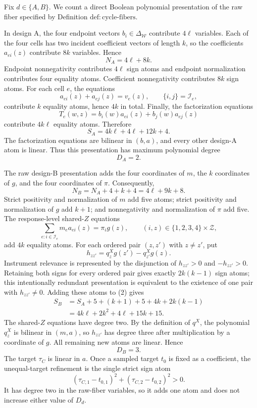 Fix \(d\in\{A,B\}\).  We count a direct Boolean polynomial presentation of the raw fiber specified by Definition \(\mathrm{def{:}cycle\text{-}fibers}\).

In design A, the four endpoint vectors \(b_i\in\Delta_{\mathcal W}\) contribute \(4\ell\) variables.  Each of the four cells has two incident coefficient vectors of length \(k\), so the coefficients \(a_{ei}(z)\) contribute \(8k\) variables.  Hence
\[
N_A=4\ell+8k.                                                   \tag{1}
\]
Endpoint nonnegativity contributes \(4\ell\) sign atoms and endpoint normalization contributes four equality atoms.  Coefficient nonnegativity contributes \(8k\) sign atoms.  For each cell \(e\), the equations
\[
a_{ei}(z)+a_{ej}(z)=v_e(z),\qquad \{i,j\}=\mathcal I_e,
\]
contribute \(k\) equality atoms, hence \(4k\) in total.  Finally, the factorization equations
\[
T_e(w,z)=b_i(w)a_{ei}(z)+b_j(w)a_{ej}(z)
\]
contribute \(4k\ell\) equality atoms.  Therefore
\[
S_A=4k\ell+4\ell+12k+4.                                       \tag{2}
\]
The factorization equations are bilinear in \((b,a)\), and every other design-A atom is linear.  Thus this presentation has maximum polynomial degree
\[
D_A=2.                                                         \tag{3}
\]

The raw design-B presentation adds the four coordinates of \(m\), the \(k\) coordinates of \(g\), and the four coordinates of \(\pi\).  Consequently,
\[
N_B=N_A+4+k+4=4\ell+9k+8.                                    \tag{4}
\]
Strict positivity and normalization of \(m\) add five atoms; strict positivity and normalization of \(g\) add \(k+1\); and nonnegativity and normalization of \(\pi\) add five.  The response-level shared-\(Z\) equations
\[
\sum_{e:i\in\mathcal I_e}m_ea_{ei}(z)=\pi_i g(z),
\qquad (i,z)\in\{1,2,3,4\}\times\mathcal Z,
\]
add \(4k\) equality atoms.  For each ordered pair \((z,z')\) with \(z\ne z'\), put
\[
h_{zz'}=q^X_zg(z')-q^X_{z'}g(z).
\]
Instrument relevance is represented by the disjunction of \(h_{zz'}>0\) and \(-h_{zz'}>0\).  Retaining both signs for every ordered pair gives exactly \(2k(k-1)\) sign atoms; this intentionally redundant presentation is equivalent to the existence of one pair with \(h_{zz'}\ne0\).  Adding these atoms to (2) gives
\[
\begin{aligned}
S_B
&=S_A+5+(k+1)+5+4k+2k(k-1)\\
&=4k\ell+2k^2+4\ell+15k+15.                              \tag{5}
\end{aligned}
\]
The shared-\(Z\) equations have degree two.  By the definition of \(q^X\), the polynomial \(q^X_z\) is bilinear in \((m,a)\), so \(h_{zz'}\) has degree three after multiplication by a coordinate of \(g\).  All remaining new atoms are linear.  Hence
\[
D_B=3.                                                         \tag{6}
\]
The target \(\tau_C\) is linear in \(a\).  Once a sampled target \(t_0\) is fixed as a coefficient, the unequal-target refinement is the single strict sign atom
\[
(\tau_{C,1}-t_{0,1})^2+(\tau_{C,2}-t_{0,2})^2>0.
\]
It has degree two in the raw-fiber variables, so it adds one atom and does not increase either value of \(D_d\).

